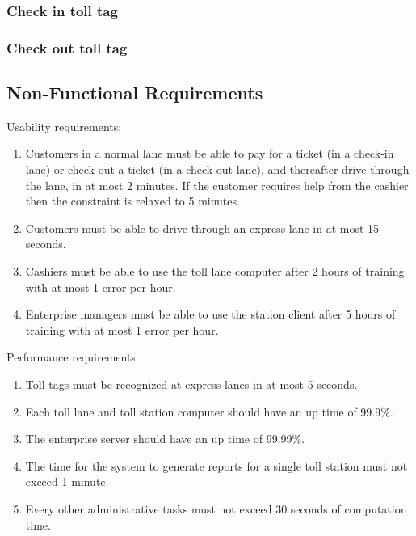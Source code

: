 \subsubsection{Check in toll tag} \label{sec:use_case_check_in_toll_tag}

\subsubsection{Check out toll tag} \label{sec:use_case_check_out_toll_tag}





\subsection{Non-Functional Requirements}
Usability requirements:
\begin{enumerate}
\item Customers in a normal lane must be able to pay for a ticket (in a check-in lane) or check out a ticket (in a check-out lane), and thereafter drive through the lane, in at most 2 minutes. If the customer requires help from the cashier then the constraint is relaxed to 5 minutes.
\item Customers must be able to drive through an express lane in at most 15 seconds.
\item Cashiers must be able to use the toll lane computer after 2 hours of training with at most 1 error per hour.
\item Enterprise managers must be able to use the station client after 5 hours of training with at most 1 error per hour.
\end{enumerate}


Performance requirements:
\begin{enumerate}
\item Toll tags must be recognized at express lanes in at most 5 seconds.
\item Each toll lane and toll station computer should have an up time of 99.9\%.
\item The enterprise server should have an up time of 99.99\%.
\item The time for the system to generate reports for a single toll station must not exceed 1 minute.
\item Every other administrative tasks must not exceed 30 seconds of computation time.
\end{enumerate}